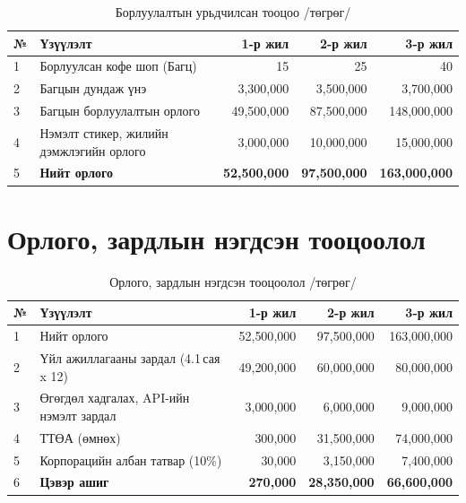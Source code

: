 \begin{table}[h]
  \centering
  \caption{Борлуулалтын урьдчилсан тооцоо /төгрөг/}
  \label{tab:ch6-orlogo}
  \small
  \begin{tabular}{@{}p{0.8cm}p{4.4cm}rrr@{}}
    \toprule
    \textbf{№} & \textbf{Үзүүлэлт} & \textbf{1-р жил} & \textbf{2-р жил} &
    \textbf{3-р жил} \\ \midrule
    1 & Борлуулсан кофе шоп (Багц) & 15 & 25 & 40 \\
    2 & Багцын дундаж үнэ & 3{,}300{,}000 & 3{,}500{,}000 & 3{,}700{,}000 \\
    3 & Багцын борлуулалтын орлого & 49{,}500{,}000 & 87{,}500{,}000 & 148{,}000{,}000 \\
    4 & Нэмэлт стикер, жилийн дэмжлэгийн орлого & 3{,}000{,}000 &
        10{,}000{,}000 & 15{,}000{,}000 \\
    5 & \textbf{Нийт орлого} & \textbf{52{,}500{,}000} &
        \textbf{97{,}500{,}000} & \textbf{163{,}000{,}000} \\
    \bottomrule
  \end{tabular}
\end{table}

\section{Орлого, зардлын нэгдсэн тооцоолол}

\begin{table}[h]
  \centering
  \caption{Орлого, зардлын нэгдсэн тооцоолол /төгрөг/}
  \label{tab:ch6-negtetsen}
  \small
  \begin{tabular}{@{}p{0.6cm}p{6.4cm}rrr@{}}
    \toprule
    \textbf{№} & \textbf{Үзүүлэлт} & \textbf{1-р жил} & \textbf{2-р жил} &
    \textbf{3-р жил} \\ \midrule
    1 & Нийт орлого & 52{,}500{,}000 & 97{,}500{,}000 & 163{,}000{,}000 \\
    2 & Үйл ажиллагааны зардал (4.1\,сая x 12) & 49{,}200{,}000 &
        60{,}000{,}000 & 80{,}000{,}000 \\
    3 & Өгөгдөл хадгалах, API-ийн нэмэлт зардал & 3{,}000{,}000 &
        6{,}000{,}000 & 9{,}000{,}000 \\
    4 & ТТӨА (өмнөх) & 300{,}000 & 31{,}500{,}000 & 74{,}000{,}000 \\
    5 & Корпорацийн албан татвар (10\%) & 30{,}000 & 3{,}150{,}000 & 7{,}400{,}000 \\
    6 & \textbf{Цэвэр ашиг} & \textbf{270{,}000} &
        \textbf{28{,}350{,}000} & \textbf{66{,}600{,}000} \\
    \bottomrule
  \end{tabular}
\end{table}

